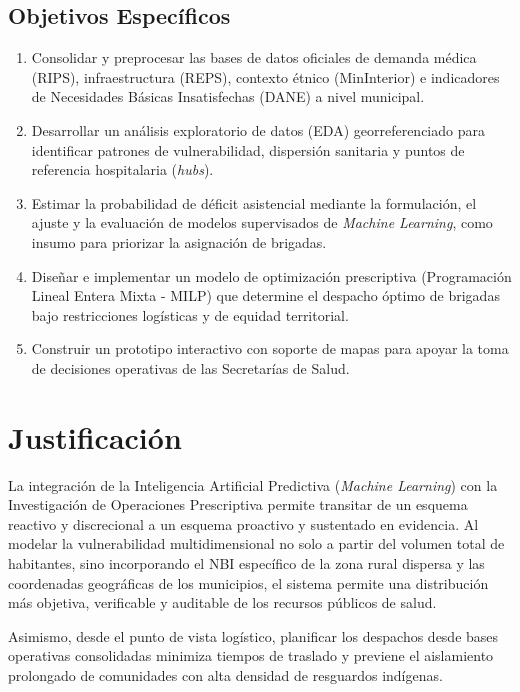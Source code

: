 \documentclass[12pt]{article}
\begin{document}
\subsection{Objetivos Específicos}
\begin{enumerate}[label=\arabic*.]
    \item Consolidar y preprocesar las bases de datos oficiales de demanda médica (RIPS), infraestructura (REPS), contexto étnico (MinInterior) e indicadores de Necesidades Básicas Insatisfechas (DANE) a nivel municipal.
    \item Desarrollar un análisis exploratorio de datos (EDA) georreferenciado para identificar patrones de vulnerabilidad, dispersión sanitaria y puntos de referencia hospitalaria (\textit{hubs}).
    \item Estimar la probabilidad de déficit asistencial mediante la formulación, el ajuste y la evaluación de modelos supervisados de \textit{Machine Learning}, como insumo para priorizar la asignación de brigadas.
    \item Diseñar e implementar un modelo de optimización prescriptiva (Programación Lineal Entera Mixta - MILP) que determine el despacho óptimo de brigadas bajo restricciones logísticas y de equidad territorial.
    \item Construir un prototipo interactivo con soporte de mapas para apoyar la toma de decisiones operativas de las Secretarías de Salud.
\end{enumerate}

\section{Justificación}
La integración de la Inteligencia Artificial Predictiva (\textit{Machine Learning}) con la Investigación de Operaciones Prescriptiva permite transitar de un esquema reactivo y discrecional a un esquema proactivo y sustentado en evidencia. Al modelar la vulnerabilidad multidimensional no solo a partir del volumen total de habitantes, sino incorporando el NBI específico de la zona rural dispersa y las coordenadas geográficas de los municipios, el sistema permite una distribución más objetiva, verificable y auditable de los recursos públicos de salud.

Asimismo, desde el punto de vista logístico, planificar los despachos desde bases operativas consolidadas minimiza tiempos de traslado y previene el aislamiento prolongado de comunidades con alta densidad de resguardos indígenas.
\end{document}
